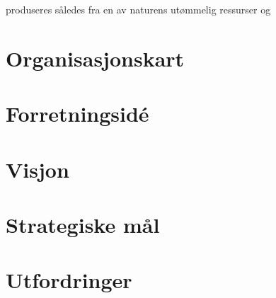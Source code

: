 \indent \newline produseres således fra en av naturens utømmelig ressurser og

\section{Organisasjonskart}
\section{Forretningsidé}
\section{Visjon}
\section{Strategiske mål}
\section{Utfordringer}
